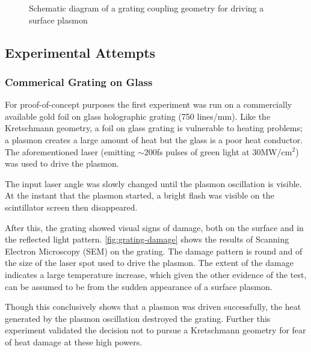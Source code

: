 \begin{figure}
  \centering
  
  \caption{Schematic diagram of a grating coupling geometry for driving a surface plasmon}
  \label{fig:plasmon_schematic}
\end{figure}

\subsection{Experimental Attempts}

\subsubsection{Commerical Grating on Glass}

For proof-of-concept purposes the first experiment was run on a commercially available gold foil on glass holographic grating (750 lines/mm).
Like the Kretschmann geometry, a foil on glass grating is vulnerable to heating problems; a plasmon creates a large amount of heat but the glass is a poor heat conductor.
The aforementioned laser (emitting $\sim$200fs pulses of green light at 30MW/cm$^2$) was used to drive the plasmon.

The input laser angle was slowly changed until the plasmon oscillation is visible.
At the instant that the plasmon started, a bright flash was visible on the scintillator screen then disappeared.

After this, the grating showed visual signs of damage, both on the surface and in the reflected light pattern.
\ref{fig:grating-damage} shows the results of Scanning Electron Microscopy (SEM) on the grating.
The damage pattern is round and of the size of the laser spot used to drive the plasmon.
The extent of the damage indicates a large temperature increase, which given the other evidence of the test, can be assumed to be from the sudden appearance of a surface plasmon.

Though this conclusively shows that a plasmon was driven successfully, the heat generated by the plasmon oscillation destroyed the grating.
Further this experiment validated the decision not to pursue a Kretschmann geometry for fear of heat damage at these high powers.

